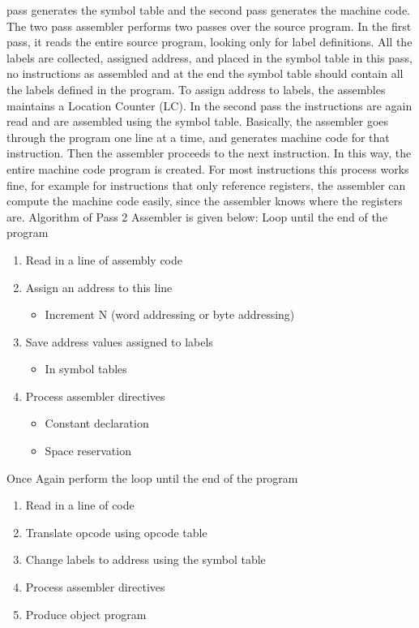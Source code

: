 \documentclass[a4paper,12pt]{extarticle}
\begin{document}
	pass generates the symbol table and the second pass generates the machine code.\newline
	The two pass assembler performs two passes over the source program.\newline
	In the first pass, it reads the entire source program, looking only for label definitions.
	All the labels are collected, assigned address, and placed in the symbol
	table in this pass, no instructions as assembled and at the end the symbol table
	should contain all the labels defined in the program. To assign address to labels,
	the assembles maintains a Location Counter (LC).\newline 
	In the second pass the instructions are again read and are assembled using the
	symbol table. Basically, the assembler goes through the program one line at a time,
	and generates machine code for that instruction. Then the assembler proceeds to the
	next instruction. In this way, the entire machine code program is created. For most
	instructions this process works fine, for example for instructions that only reference
	registers, the assembler can compute the machine code easily, since the assembler
	knows where the registers are.\newline
	Algorithm of Pass 2 Assembler is given below: \newline
	Loop until the end of the program
	\begin{enumerate}
		\item Read in a line of assembly code
		\item Assign an address to this line
		\begin{itemize}
			\item Increment N (word addressing or byte addressing)
		\end{itemize}
		\item Save address values assigned to labels
		\begin{itemize}
			\item In symbol tables
		\end{itemize}
		\item Process assembler directives
		\begin{itemize}
			\item Constant declaration
			\item Space reservation
		\end{itemize}
	\end{enumerate}
	Once Again perform the loop until the end of the program
	\begin{enumerate}
		\item Read in a line of code
		\item Translate opcode using opcode table
		\item Change labels to address using the symbol table
		\item Process assembler directives
		\item Produce object program
	\end{enumerate}
\end{document}
